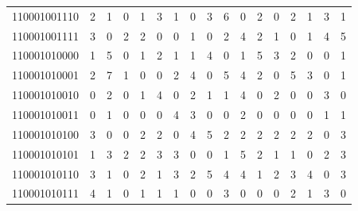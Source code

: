 \documentclass[10pt,a4paper]{article}
\begin{document}
\begin{longtable}{ |c|c|c|c|c|c|c|c|c|c|c|c|c|c|c|c|c| }
    110001001110              & 2                            & 1                                & 0                            & 1                              & 3   & 1   & 0   & 3   & 6   & 0   & 2   & 0   & 2   & 1   & 3   & 1   \\
    110001001111              & 3                            & 0                                & 2                            & 2                              & 0   & 0   & 1   & 0   & 2   & 4   & 2   & 1   & 0   & 1   & 4   & 5   \\
    110001010000              & 1                            & 5                                & 0                            & 1                              & 2   & 1   & 1   & 4   & 0   & 1   & 5   & 3   & 2   & 0   & 0   & 1   \\
    110001010001              & 2                            & 7                                & 1                            & 0                              & 0   & 2   & 4   & 0   & 5   & 4   & 2   & 0   & 5   & 3   & 0   & 1   \\
    110001010010              & 0                            & 2                                & 0                            & 1                              & 4   & 0   & 2   & 1   & 1   & 4   & 0   & 2   & 0   & 0   & 3   & 0   \\
    110001010011              & 0                            & 1                                & 0                            & 0                              & 0   & 4   & 3   & 0   & 0   & 2   & 0   & 0   & 0   & 0   & 1   & 1   \\
    110001010100              & 3                            & 0                                & 0                            & 2                              & 2   & 0   & 4   & 5   & 2   & 2   & 2   & 2   & 2   & 2   & 0   & 3   \\
    110001010101              & 1                            & 3                                & 2                            & 2                              & 3   & 3   & 0   & 0   & 1   & 5   & 2   & 1   & 1   & 0   & 2   & 3   \\
    110001010110              & 3                            & 1                                & 0                            & 2                              & 1   & 3   & 2   & 5   & 4   & 4   & 1   & 2   & 3   & 4   & 0   & 3   \\
    110001010111              & 4                            & 1                                & 0                            & 1                              & 1   & 1   & 0   & 0   & 3   & 0   & 0   & 0   & 2   & 1   & 3   & 0   \\

\end{longtable}
\end{document}
